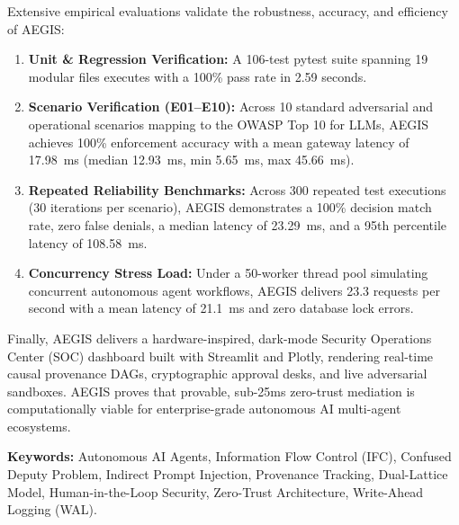 Extensive empirical evaluations validate the robustness, accuracy, and efficiency of AEGIS:
\begin{enumerate}
    \item \textbf{Unit \& Regression Verification:} A 106-test pytest suite spanning 19 modular files executes with a 100\% pass rate in 2.59 seconds.
    \item \textbf{Scenario Verification (E01--E10):} Across 10 standard adversarial and operational scenarios mapping to the OWASP Top 10 for LLMs, AEGIS achieves 100\% enforcement accuracy with a mean gateway latency of 17.98~ms (median 12.93~ms, min 5.65~ms, max 45.66~ms).
    \item \textbf{Repeated Reliability Benchmarks:} Across 300 repeated test executions (30 iterations per scenario), AEGIS demonstrates a 100\% decision match rate, zero false denials, a median latency of 23.29~ms, and a 95th percentile latency of 108.58~ms.
    \item \textbf{Concurrency Stress Load:} Under a 50-worker thread pool simulating concurrent autonomous agent workflows, AEGIS delivers 23.3 requests per second with a mean latency of 21.1~ms and zero database lock errors.
\end{enumerate}

Finally, AEGIS delivers a hardware-inspired, dark-mode Security Operations Center (SOC) dashboard built with Streamlit and Plotly, rendering real-time causal provenance DAGs, cryptographic approval desks, and live adversarial sandboxes. AEGIS proves that provable, sub-25ms zero-trust mediation is computationally viable for enterprise-grade autonomous AI multi-agent ecosystems.

\vspace{0.8cm}
\noindent
\textbf{Keywords:} Autonomous AI Agents, Information Flow Control (IFC), Confused Deputy Problem, Indirect Prompt Injection, Provenance Tracking, Dual-Lattice Model, Human-in-the-Loop Security, Zero-Trust Architecture, Write-Ahead Logging (WAL).

\newpage

